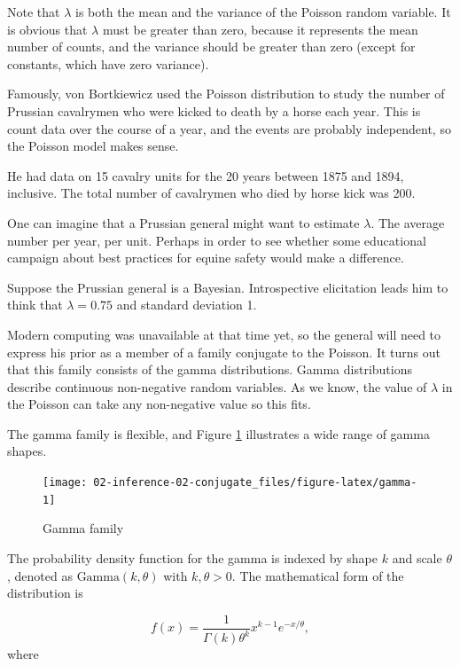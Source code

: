 \documentclass[]{book}
\theoremstyle{definition}
\theoremstyle{definition}
\theoremstyle{definition}
\theoremstyle{remark}
\let\BeginKnitrBlock\begin \let\EndKnitrBlock\end
\begin{document}
Note that \(\lambda\) is both the mean and the variance of the Poisson
random variable. It is obvious that \(\lambda\) must be greater than
zero, because it represents the mean number of counts, and the variance
should be greater than zero (except for constants, which have zero
variance).

\BeginKnitrBlock{example}
\protect\hypertarget{exm:Poisson}{}{\label{exm:Poisson} }Famously, von
Bortkiewicz used the Poisson distribution to study the number of
Prussian cavalrymen who were kicked to death by a horse each year. This
is count data over the course of a year, and the events are probably
independent, so the Poisson model makes sense.

He had data on 15 cavalry units for the 20 years between 1875 and 1894,
inclusive. The total number of cavalrymen who died by horse kick was
200.

One can imagine that a Prussian general might want to estimate
\(\lambda\). The average number per year, per unit. Perhaps in order to
see whether some educational campaign about best practices for equine
safety would make a difference.
\EndKnitrBlock{example}

Suppose the Prussian general is a Bayesian. Introspective elicitation
leads him to think that \(\lambda=0.75\) and standard deviation 1.

Modern computing was unavailable at that time yet, so the general will
need to express his prior as a member of a family conjugate to the
Poisson. It turns out that this family consists of the gamma
distributions. Gamma distributions describe continuous non-negative
random variables. As we know, the value of \(\lambda\) in the Poisson
can take any non-negative value so this fits.

The gamma family is flexible, and Figure \ref{fig:gamma} illustrates a
wide range of gamma shapes.

\begin{figure}

{\centering \texttt{[image: 02-inference-02-conjugate\_files/figure-latex/gamma-1]} 

}

\caption{Gamma family}\label{fig:gamma}
\end{figure}

The probability density function for the gamma is indexed by shape \(k\)
and scale \(\theta\), denoted as \(\text{Gamma}(k,\theta)\) with
\(k,\theta > 0\). The mathematical form of the distribution is

\[f(x) = \dfrac{1}{\Gamma(k)\theta^k} x^{k-1} e^{-x/\theta},\] where
\end{document}
